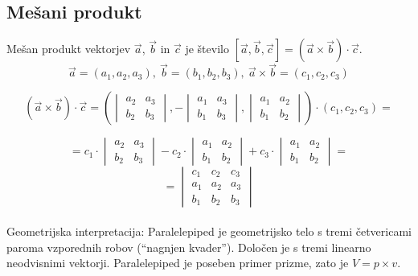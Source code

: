 \documentclass[a4paper,12pt]{article}
\begin{document}
\newpage

\begin{center}
\subsection{Mešani produkt}
\end{center}

Mešan produkt vektorjev $\vec{a}$, $\vec{b}$ in $\vec{c}$ je število $[\vec{a},\vec{b},\vec{c}] = (\vec{a} \times \vec{b}) \cdot \vec{c}$. \\

$$ \vec{a} = (a_1, a_2, a_3),~ \vec{b} = (b_1, b_2, b_3),~ \vec{a} \times \vec{b} = (c_1, c_2, c_3)$$

$$
(\vec{a} \times \vec{b}) \cdot \vec{c}= (
\begin{vmatrix}
a_2 & a_3 \\
b_2 & b_3
\end{vmatrix}
,-
\begin{vmatrix}
a_1 & a_3 \\
b_1 & b_3
\end{vmatrix}
,
\begin{vmatrix}
a_1 & a_2 \\
b_1 & b_2 
\end{vmatrix}
) \cdot (c_1, c_2, c_3) = $$

$$ = c_1 \cdot
\begin{vmatrix}
a_2 & a_3 \\
b_2 & b_3
\end{vmatrix}
- c_2 \cdot
\begin{vmatrix}
a_1 & a_2 \\
b_1 & b_2
\end{vmatrix}
+ c_3 \cdot
\begin{vmatrix}
a_1 & a_2 \\
b_1 & b_2
\end{vmatrix}
= $$
$$ =
\begin{vmatrix}
c_1 & c_2 & c_3 \\
a_1 & a_2 & a_3 \\
b_1 & b_2 & b_3
\end{vmatrix} 
$$ \\

Geometrijska interpretacija: Paralelepiped je geometrijsko telo s tremi četvericami paroma vzporednih robov (``nagnjen kvader''). Določen je s tremi linearno neodvisnimi vektorji. Paralelepiped je poseben primer prizme, zato je $ V = p \times v $. \\
\end{document}
